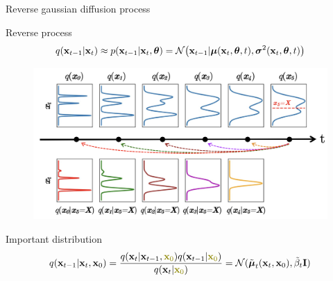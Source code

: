 \begin{frame}{Reverse gaussian diffusion process}
	\begin{block}{Reverse process}
		\vspace{-0.6cm}
		\[
			q(\mathbf{x}_{t-1}|\mathbf{x}_{t}) \approx p(\mathbf{x}_{t - 1} | \mathbf{x}_t, \boldsymbol{\theta}) = \mathcal{N} \bigl(\mathbf{x}_{t - 1} | \boldsymbol{\mu}(\mathbf{x}_t, \boldsymbol{\theta}, t), \boldsymbol{\sigma}^2(\mathbf{x}_t, \boldsymbol{\theta}, t)\bigr)
		\]
		\vspace{-0.6cm}
	\end{block}
	\begin{figure}
		\includegraphics[width=0.7\linewidth]{figs/inverse_distr_1d}
	\end{figure}
	\vspace{-0.3cm}
	\begin{block}{Important distribution}
		\vspace{-0.6cm}
		\[
			q(\bx_{t-1}|\bx_{t}, \bx_0) = \frac{q(\bx_{t}|\bx_{t-1}, {\color{olive}\bx_0}) q(\bx_{t-1} | {\color{olive}\bx_0}) }{q(\bx_{t}| {\color{olive}\bx_0})} = \cN(\tilde{\bmu}_t(\bx_t, \bx_0), \tilde{\beta}_t \bI)
		\]
	\end{block}
	\end{frame}
